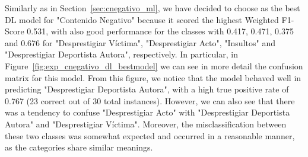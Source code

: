 %            
%            


Similarly as in Section~\ref{sec:cnegativo_ml}, we have decided to choose \textbf{\cnegtcbeto} as the best DL model for "Contenido Negativo" because it scored the highest Weighted F1-Score 0.531, with also good performance for the classes with 0.417, 0.471, 0.375 and 0.676 for "Desprestigiar Víctima", "Desprestigiar Acto", "Insultos" and "Desprestigiar Deportista Autora", respectively. In particular, in Figure~\ref{fig:exp_cnegativo_dl_bestmodel} we can see in more detail the confusion matrix for this model. From this figure, we notice that the model behaved well in predicting "Desprestigiar Deportista Autora", with a high true positive rate of 0.767 (23 correct out of 30 total instances). However, we can also see that there was a tendency to confuse "Desprestigiar Acto" with "Desprestigiar Deportista Autora" and "Desprestigiar Víctima". Moreover, the misclassification between these two classes was somewhat expected and occurred in a reasonable manner, as the categories share similar meanings.

